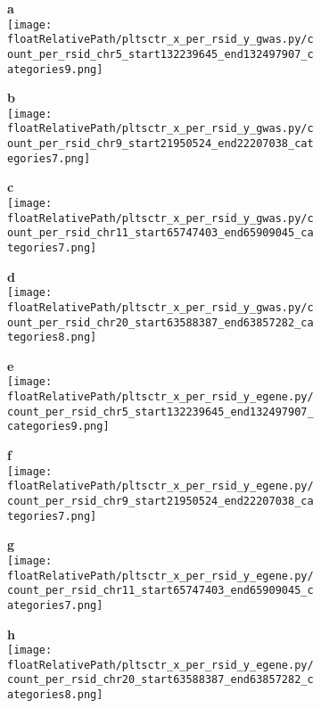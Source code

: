 \begin{figure}[!tbp]

\begin{subfigure}[]{.24\textwidth}
\textbf{a}
\\
\texttt{[image: \\floatRelativePath/pltsctr\_x\_per\_rsid\_y\_gwas.py/count\_per\_rsid\_chr5\_start132239645\_end132497907\_categories9.png]}
\end{subfigure}
%
\begin{subfigure}[]{.24\textwidth}
\textbf{b}
\\
\texttt{[image: \\floatRelativePath/pltsctr\_x\_per\_rsid\_y\_gwas.py/count\_per\_rsid\_chr9\_start21950524\_end22207038\_categories7.png]}
\end{subfigure}
%
\begin{subfigure}[]{.24\textwidth}
\textbf{c}
\\
\texttt{[image: \\floatRelativePath/pltsctr\_x\_per\_rsid\_y\_gwas.py/count\_per\_rsid\_chr11\_start65747403\_end65909045\_categories7.png]}
\end{subfigure}
%
\begin{subfigure}[]{.24\textwidth}
\textbf{d}
\\
\texttt{[image: \\floatRelativePath/pltsctr\_x\_per\_rsid\_y\_gwas.py/count\_per\_rsid\_chr20\_start63588387\_end63857282\_categories8.png]}
\end{subfigure}

\begin{subfigure}[]{.24\textwidth}
\textbf{e}
\\
\texttt{[image: \\floatRelativePath/pltsctr\_x\_per\_rsid\_y\_egene.py/count\_per\_rsid\_chr5\_start132239645\_end132497907\_categories9.png]}
\end{subfigure}
%
\begin{subfigure}[]{.24\textwidth}
\textbf{f}
\\
\texttt{[image: \\floatRelativePath/pltsctr\_x\_per\_rsid\_y\_egene.py/count\_per\_rsid\_chr9\_start21950524\_end22207038\_categories7.png]}
\end{subfigure}
%
\begin{subfigure}[]{.24\textwidth}
\textbf{g}
\\
\texttt{[image: \\floatRelativePath/pltsctr\_x\_per\_rsid\_y\_egene.py/count\_per\_rsid\_chr11\_start65747403\_end65909045\_categories7.png]}
\end{subfigure}
%
\begin{subfigure}[]{.24\textwidth}
\textbf{h}
\\
\texttt{[image: \\floatRelativePath/pltsctr\_x\_per\_rsid\_y\_egene.py/count\_per\_rsid\_chr20\_start63588387\_end63857282\_categories8.png]}
\end{subfigure}


\end{figure}
